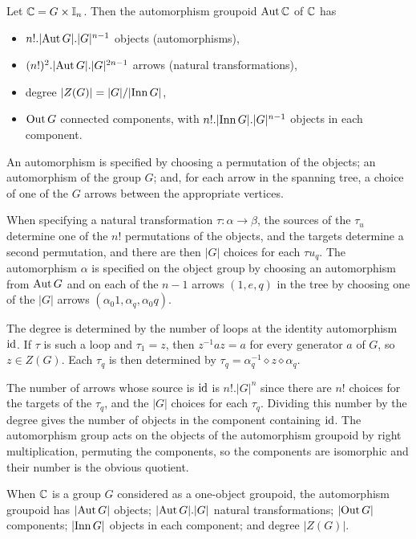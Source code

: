 \begin{thm}
Let $\mathbb{C} = G \times \mathbb{I}_n$. 
Then the automorphism groupoid $\mathrm{Aut}\,\mathbb{C}$ of $\mathbb{C}$ has
\begin{itemize}
\item
$n!.|\mathrm{Aut}\,G|.|G|^{n-1}$ objects (automorphisms), 
\item
$(n!)^2.|\mathrm{Aut}\,G|.|G|^{2n-1}$ arrows (natural transformations), 
\item
degree $|Z(G)| = |G|/|\mathrm{Inn}\,G|$, 
\item
$\mathrm{Out}\,G$ connected components, 
with $n!.|\mathrm{Inn}\,G|.|G|^{n-1}$ objects in each component. 
\end{itemize}
\end{thm}
\begin{pf}
An automorphism is specified by choosing a permutation of the objects; 
an automorphism of the group $G$; and, for each arrow in the spanning tree, 
a choice of one of the $G$ arrows between the appropriate vertices.

When specifying a natural transformation $\tau : \alpha \to \beta$, 
the sources of the $\tau_u$ determine one of the $n!$ permutations 
of the objects, and the targets determine a second permutation, 
and there are then $|G|$ choices for each $\tau u_q$. 
The automorphism $\alpha$ is specified on the object group by choosing 
an automorphism from $\mathrm{Aut}\,G$ and on each of the $n-1$ arrows 
$(1,e,q)$ in the tree by choosing one of the $|G|$ 
arrows $(\alpha_0 1,\alpha_q,\alpha_0 q)$. 

The degree is determined by the number of loops at the 
identity automorphism $\mathrm{id}$. 
If $\tau$ is such a loop and $\tau_1=z$, then $z^{-1}az=a$ for every 
generator $a$ of $G$, so $z \in Z(G)$. 
Each $\tau_q$ is then determined by 
$\tau_q = \alpha_q^{-1} \diamond z \diamond \alpha_q$. 

The number of arrows whose source is $\mathrm{id}$ is $n!.|G|^n$
since there are $n!$ choices for the targets of the $\tau_q$, 
and the $|G|$ choices for each $\tau_q$. 
Dividing this number by the degree gives the number of objects in the 
component containing $\mathrm{id}$. 
The automorphism group acts on the objects of the automorphism groupoid 
by right multiplication, permuting the components, so the components 
are isomorphic and their number is the obvious quotient. 
\end{pf}

\begin{cor}
When $\mathbb{C}$ is a group $G$ considered as a one-object groupoid, 
the automorphism groupoid has $|\mathrm{Aut}\,G|$ objects; 
$|\mathrm{Aut}\,G|.|G|$ natural transformations; $|\mathrm{Out}\,G|$ components; 
$|\mathrm{Inn}\,G|$ objects in each component; and degree $|Z(G)|$. 
\end{cor}

